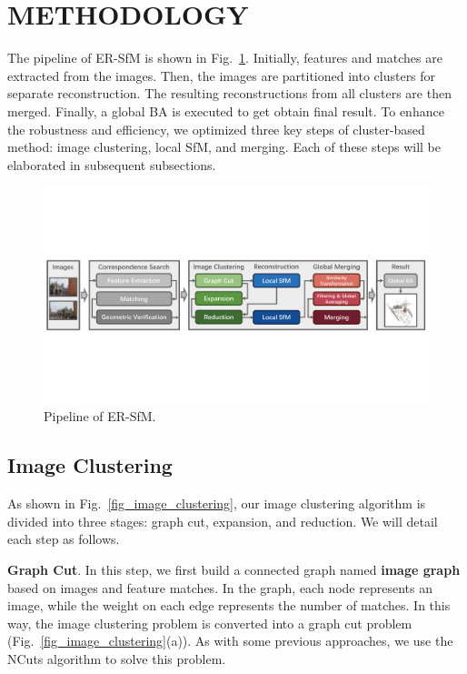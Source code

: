 \documentclass[runningheads]{llncs}
\begin{document}
\section{METHODOLOGY}

The pipeline of ER-SfM is shown in Fig.~\ref{fig_pipeline}. Initially, features and matches are extracted from the images. Then, the images are partitioned into clusters for separate reconstruction. The resulting reconstructions from all clusters are then merged. Finally, a global BA is executed to get obtain final result. To enhance the robustness and efficiency, we optimized three key steps of cluster-based method: image clustering, local SfM, and merging. Each of these steps will be elaborated in subsequent subsections.

\begin{figure}[t]
    \centering
        \includegraphics[width=1\textwidth]{figs/pipeline.pdf}
        \caption{Pipeline of ER-SfM.}
    \label{fig_pipeline}
    \vspace{-0.5em}
\end{figure}

\subsection{Image Clustering}
As shown in Fig.~\ref{fig_image_clustering}, our image clustering algorithm is divided into three stages: graph cut, expansion, and reduction. We will detail each step as follows.

\textbf{Graph Cut}. In this step, we first build a connected graph named \textbf{image graph} based on images and feature matches. In the graph, each node represents an image, while the weight on each edge represents the number of matches. In this way, the image clustering problem is converted into a graph cut problem (Fig.~\ref{fig_image_clustering}(a)). As with some previous approaches\cite{gsfm,Divide_conquer,AccPara}, we use the NCuts\cite{NCUT} algorithm to solve this problem.
\end{document}
